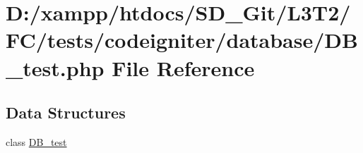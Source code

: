 \hypertarget{tests_2codeigniter_2database_2_d_b__test_8php}{}\section{D\+:/xampp/htdocs/\+S\+D\+\_\+\+Git/\+L3\+T2/\+F\+C/tests/codeigniter/database/\+D\+B\+\_\+test.php File Reference}
\label{tests_2codeigniter_2database_2_d_b__test_8php}
\subsection*{Data Structures}
\begin{DoxyCompactItemize}
\item 
class \hyperlink{class_d_b__test}{D\+B\+\_\+test}
\end{DoxyCompactItemize}
